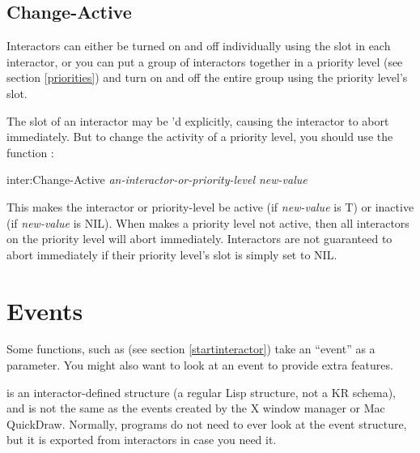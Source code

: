 \subsection{Change-Active}
\label{change-active}
Interactors can either be turned on and off individually using
the  slot in each interactor, or you can put a group of
interactors together in a priority level (see section \ref{priorities})
and turn on and off the entire group using the priority level's 
slot.

The  slot of an interactor may be 'd explicitly,
causing the interactor to abort immediately.  But to change the activity of
a priority level, you should use the function :

\begin{programexample}
inter:Change-Active {\it an-interactor-or-priority-level new-value}\value{function}
\end{programexample}
This makes the interactor or priority-level be active (if {\it new-value} is T)
or inactive (if {\it new-value} is NIL).  When  makes a
priority level not active, then all interactors on the priority level will
abort immediately.  Interactors are not guaranteed to abort immediately
if their priority level's  slot is simply set to NIL.



\section{Events}
\label{Events}

Some functions, such as  (see section
\ref{startinteractor}) take an ``event'' as a
parameter.  You might also want to look at an event to provide extra
features.

 is an interactor-defined structure (a regular Lisp
structure, not a KR schema), and is not the same as
the events created by the X window manager or Mac QuickDraw.
Normally, programs do not need to ever look at the event structure,
but it is exported from interactors in case you need it.

